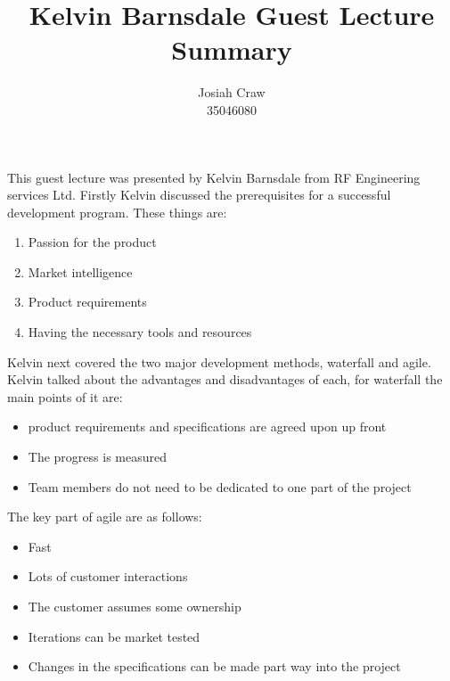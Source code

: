 \documentclass{article}
\title{Kelvin Barnsdale Guest Lecture Summary}
\author{Josiah Craw\\35046080}
\begin{document}
\maketitle

This guest lecture was presented by Kelvin Barnsdale from RF Engineering services Ltd. Firstly
Kelvin discussed the prerequisites for a successful development program. These things are:

\begin{enumerate}
    
    \item{Passion for the product}

    \item{Market intelligence}

    \item{Product requirements}

    \item{Having the necessary tools and resources}

\end{enumerate}

Kelvin next covered the two major development methods, waterfall and agile. Kelvin talked about
the advantages and disadvantages of each, for waterfall the main points of it are:

\begin{itemize}

    \item{product requirements and specifications are agreed upon up front}

    \item{The progress is measured}

    \item{Team members do not need to be dedicated to one part of the project}

\end{itemize}

The key part of agile are as follows:

\begin{itemize}

    \item{Fast}

    \item{Lots of customer interactions}

    \item{The customer assumes some ownership}

    \item{Iterations can be market tested}

    \item{Changes in the specifications can be made part way into the project}

\end{itemize}
\end{document}
